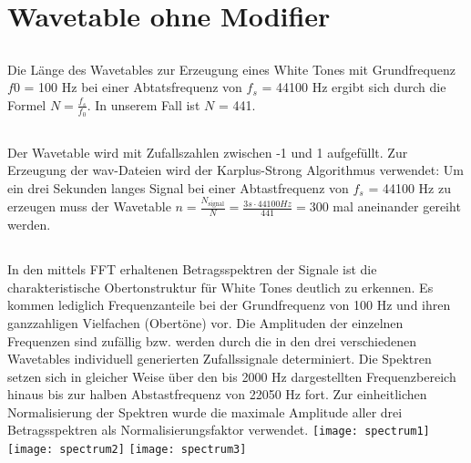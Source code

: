 \chapter{Wavetable ohne Modifier}
\section{}
Die Länge des Wavetables zur Erzeugung eines White Tones mit Grundfrequenz $f0$ = 100 Hz bei einer Abtatsfrequenz von $f_s$ = 44100 Hz ergibt sich durch die Formel $N = \frac{f_s} {f_0}$. In unserem Fall ist $N$ = 441. 
\section{}
Der Wavetable wird mit Zufallszahlen zwischen -1 und 1 aufgefüllt. Zur Erzeugung der wav-Dateien wird der Karplus-Strong Algorithmus verwendet: Um ein drei Sekunden langes Signal bei einer Abtastfrequenz von $f_s$ = 44100 Hz zu erzeugen muss der Wavetable $n = \frac{N_{\mathrm{signal}}}{N} = \frac{3s \cdot 44100Hz}{441} = 300$ mal aneinander gereiht werden.
\section{}
In den mittels FFT erhaltenen Betragsspektren der Signale ist die charakteristische Obertonstruktur für White Tones deutlich zu erkennen. Es kommen lediglich Frequenzanteile bei der Grundfrequenz von 100 Hz und ihren ganzzahligen Vielfachen (Obertöne) vor. Die Amplituden der einzelnen Frequenzen sind zufällig bzw. werden durch die in den drei verschiedenen Wavetables individuell generierten Zufallssignale determiniert. Die Spektren setzen sich in gleicher Weise über den bis 2000 Hz dargestellten Frequenzbereich hinaus bis zur halben Abstastfrequenz von 22050 Hz fort. Zur einheitlichen Normalisierung der Spektren wurde die maximale Amplitude aller drei Betragsspektren als Normalisierungsfaktor verwendet.\newline 
\texttt{[image: spectrum1]}
\newline
\texttt{[image: spectrum2]}
\newline
\texttt{[image: spectrum3]}
